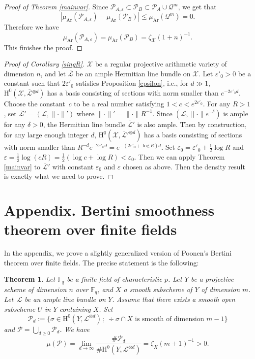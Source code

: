\documentclass[11pt]{article}
\newcommand{\ie}{i.e.,\xspace}
\numberwithin{equation}{section}
\newcommand{\sep}{\,;\,}
\theoremstyle{plain}
\newtheorem{thm}{Theorem}[section]
\theoremstyle{definition}
\newcommand{\ho}{\mathrm{H}}
\newcommand{\X}{\mathcal{X}}
\newcommand{\Li}{\overline{\mathcal{L}}{}}
\newcommand{\li}{\mathcal{L}}
\newcommand{\F}{\mathbb{F}}
\begin{document}
\begin{proof}[Proof of Theorem \ref{mainvar}]
Since $\mathcal{P}_{A,\varepsilon}\subset \mathcal{P}_B\subset \mathcal{P}_A\cup \mathcal{Q}^m$, we get that
\[
|\mu_{\mathrm{Ar}}(\mathcal{P}_{A,\varepsilon})-\mu_{\mathrm{Ar}}(\mathcal{P}_B)|\leq \mu_{\mathrm{Ar}}(\mathcal{Q}^m)=0.
\]
Therefore we have
\[
\mu_{\mathrm{Ar}}(\mathcal{P}_{A,\varepsilon})=\mu_{\mathrm{Ar}}(\mathcal{P}_B)=\zeta_{\X}(1+n)^{-1}.
\]
This finishes the proof.
\end{proof}

\begin{proof}[Proof of Corollary \ref{singR}] $\X$ be a regular projective arithmetic variety of dimension $n$, and let $\Li$ be an ample Hermitian line bundle on $\X$. Let $\varepsilon'_0>0$ be a constant such that $2\varepsilon'_0$ satisfies Proposition \ref{epsilon}, \ie for $d\gg 1$, $\ho^0(\X, \Li^{\otimes d})$ has a basis consisting of sections with norm smaller than $e^{-2\varepsilon'_0 d}$. Choose the constant~$c$ to be a real number satisfying $1<c<e^{2\varepsilon'_0}$. For any $R>1$, set $\Li'=(\li, \lVert\cdot\rVert')$ where $\lVert\cdot\rVert'=\lVert\cdot\rVert R^{-1}$. Since $(\li, \lVert\cdot\rVert e^{-\delta})$ is ample for any $\delta>0$, the Hermitian line bundle $\Li'$ is also ample. Then by construction, for any large enough integer $d$, $\ho^0(\X, \Li'^{\otimes d})$ has a basis consisting of sections with norm smaller than $R^{-d}e^{-2\varepsilon'_0 d}=e^{-(2\varepsilon'_0+\log R)d}$. Set $\varepsilon_0=\varepsilon'_0+\frac{1}{2}\log R$ and  $\varepsilon=\frac{1}{2}\log(cR)=\frac{1}{2}(\log c+\log R)<\varepsilon_0$. Then we can apply Theorem \ref{mainvar} to $\Li'$ with constant $\varepsilon_0$ and $\varepsilon$ chosen as above. Then the density result is exactly what we need to prove.
\end{proof}

\appendix
\section*{Appendix. Bertini smoothness theorem over finite fields}\label{finitefield}

In the appendix, we prove a slightly generalized version of Poonen's Bertini theorem over finite fields. The precise statement is the following:

\begin{thm}\label{bertinifini}
Let $\F_q$ be a finite field of characteristic $p$. Let $Y$ be a projective scheme of dimension $n$ over $\F_q$, and $X$ a smooth subscheme of $Y$ of dimension $m$. Let~$\mathcal{L}$ be an ample line bundle on $Y$. Assume that there exists a smooth open subscheme $U$ in $Y$ containing $X$.
Set
\[
\mathcal{P}_{d}:=\{\sigma\in \ho^0(Y, \mathcal{L}^{\otimes d})\sep \div \sigma\cap X \text{ is smooth of dimension }m-1\}
\]
and $\mathcal{P}=\bigcup_{d\geq 0}\mathcal{P}_{d}$.
We have
\[
\mu(\mathcal{P})=\lim_{d\to \infty} \frac{ \#\mathcal{P}_{d}}{\# \ho^0(Y, \mathcal{L}^{\otimes d})}
=\zeta_X(m+1)^{-1}>0.
\]
\end{thm}
\end{document}
